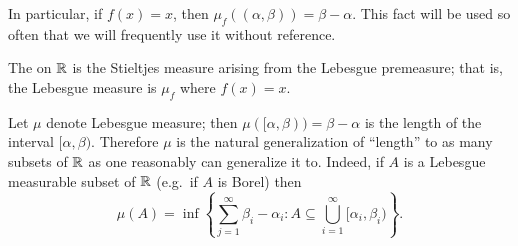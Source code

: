 \begin{subsec}
In particular, if $f(x) = x$, then $\mu_{f}((\alpha, \beta)) = \beta - \alpha$.
This fact will be used so often that we will frequently use it without reference.
\end{subsec}

\begin{definition}
The  on $\mathbb{R}$ is the Stieltjes measure arising from the Lebesgue premeasure; that is, the Lebesgue measure is $\mu_{f}$ where $f(x) = x$.
\end{definition}

\begin{subsec}
Let $\mu$ denote Lebesgue measure; then $\mu([\alpha, \beta)) = \beta - \alpha$ is the length of the interval $[\alpha, \beta)$.
Therefore $\mu$ is the natural generalization of ``length'' to as many subsets of $\mathbb{R}$ as one reasonably can generalize it to.
Indeed, if $A$ is a Lebesgue measurable subset of $\mathbb{R}$ (e.g.\ if $A$ is Borel) then
\begin{equation}\label{lebesgue measure formula}
\mu(A) = \inf \left\{\sum_{j=1}^{\infty} \beta_{i} - \alpha_{i}: A \subseteq \bigcup_{i=1}^{\infty} [\alpha_{i}, \beta_{i})\right\}.
\end{equation}
\end{subsec}

